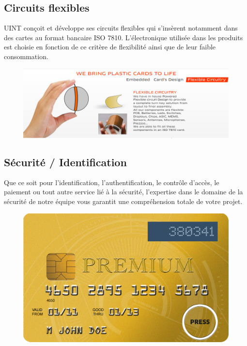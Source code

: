 \subsection{Circuits flexibles}
UINT conçoit et développe ses circuits flexibles qui s’insèrent notamment dans des cartes au format bancaire ISO 7810. L’électronique utilisée dans les produits est choisie en fonction de ce critère de flexibilité ainsi que de leur faible consommation.

\begin{figure}[!htbp]
  \centering
    \includegraphics[scale=0.5]{images/flx}
\end{figure}


\subsection{Sécurité / Identification}

Que ce soit pour l’identification, l’authentification, le contrôle d’accès, le paiement ou tout autre service lié à la sécurité, l’expertise dans le domaine de la sécurité de notre équipe vous garantit une compréhension totale de votre projet.

\begin{figure}[!htbp]
  \centering
    \includegraphics[scale=0.7]{images/pre}
\end{figure}

